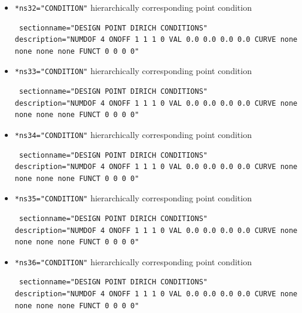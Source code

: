 \begin{itemize}
 \item \verb|*ns32="CONDITION"| \qquad hierarchically corresponding point condition
\begin{small} \begin{verbatim} sectionname="DESIGN POINT DIRICH CONDITIONS"
description="NUMDOF 4 ONOFF 1 1 1 0 VAL 0.0 0.0 0.0 0.0 CURVE none none none none FUNCT 0 0 0 0"
\end{verbatim} \end{small}

 \item \verb|*ns33="CONDITION"| \qquad hierarchically corresponding point condition
\begin{small} \begin{verbatim} sectionname="DESIGN POINT DIRICH CONDITIONS"
description="NUMDOF 4 ONOFF 1 1 1 0 VAL 0.0 0.0 0.0 0.0 CURVE none none none none FUNCT 0 0 0 0"
\end{verbatim} \end{small} 

\item \verb|*ns34="CONDITION"| \qquad hierarchically corresponding point condition
\begin{small} \begin{verbatim} sectionname="DESIGN POINT DIRICH CONDITIONS"
description="NUMDOF 4 ONOFF 1 1 1 0 VAL 0.0 0.0 0.0 0.0 CURVE none none none none FUNCT 0 0 0 0"
\end{verbatim} \end{small}

 \item \verb|*ns35="CONDITION"| \qquad hierarchically corresponding point condition
\begin{small} \begin{verbatim} sectionname="DESIGN POINT DIRICH CONDITIONS"
description="NUMDOF 4 ONOFF 1 1 1 0 VAL 0.0 0.0 0.0 0.0 CURVE none none none none FUNCT 0 0 0 0"
\end{verbatim} \end{small}

 \item \verb|*ns36="CONDITION"| \qquad hierarchically corresponding point condition
\begin{small} \begin{verbatim} sectionname="DESIGN POINT DIRICH CONDITIONS"
description="NUMDOF 4 ONOFF 1 1 1 0 VAL 0.0 0.0 0.0 0.0 CURVE none none none none FUNCT 0 0 0 0"
\end{verbatim} \end{small}


\end{itemize}
